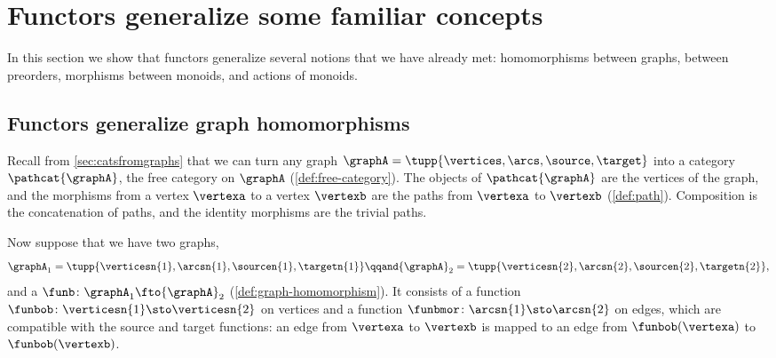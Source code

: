 
\section{Functors generalize some familiar concepts}
\label{sec:functors-generalize}

In this section we show that functors generalize several notions that we have already met: homomorphisms between graphs,  between preorders, morphisms between monoids, and actions of monoids.

\subsection{Functors generalize graph homomorphisms}
\label{sec:functors-generalize-graph-homomorphisms}

Recall from \cref{sec:catsfromgraphs} that we can turn any graph $\graphA=\tupp{\vertices,\arcs, \source,\target}$ into a category $\pathcat{\graphA}$, the free category on $\graphA$ (\cref{def:free-category}).
The objects of $\pathcat{\graphA}$ are the vertices of the graph, and the morphisms from a vertex $\vertexa$ to a vertex $\vertexb$ are the paths from $\vertexa$ to $\vertexb$ (\cref{def:path}).
Composition is the concatenation of paths, and the identity morphisms are the trivial paths.

Now suppose that we have two graphs,
\begin{equation}
    {\graphA}_1=\tupp{\verticesn{1},\arcsn{1},\sourcen{1},\targetn{1}}
    \qqand
    {\graphA}_2=\tupp{\verticesn{2},\arcsn{2},\sourcen{2},\targetn{2}},
\end{equation}
and a  $\funb \colon {\graphA}_1 \fto {\graphA}_2$ (\cref{def:graph-homomorphism}).
It consists of a function $\funbob \colon \verticesn{1} \sto \verticesn{2}$ on vertices and a function $\funbmor \colon \arcsn{1} \sto \arcsn{2}$ on edges, which are compatible with the source and target functions: an edge from $\vertexa$ to $\vertexb$ is mapped to an edge from $\funbob(\vertexa)$ to $\funbob(\vertexb)$.

